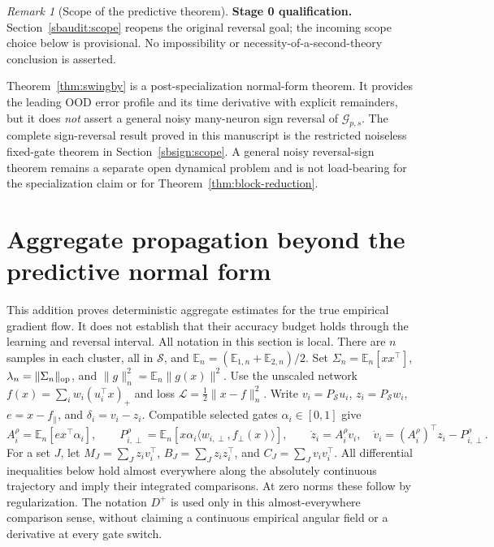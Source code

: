 \documentclass{article} %
\theoremstyle{plain}
\theoremstyle{definition}
\theoremstyle{remark}
\newtheorem{remark}[theorem]{Remark}
\begin{document}
\begin{remark}[Scope of the predictive theorem]
\label{rem:T3-scope-A}
\textbf{Stage 0 qualification.} Section~\ref{sbaudit:scope} reopens the original reversal goal; the incoming scope choice below is provisional. No impossibility or necessity-of-a-second-theory conclusion is asserted.

Theorem~\ref{thm:swingby} is a post-specialization normal-form theorem.  It
provides the leading OOD error profile and its time derivative with explicit
remainders, but it does \emph{not} assert a general noisy many-neuron sign
reversal of $\mathcal G_{p,s}$.  The complete sign-reversal result proved in
this manuscript is the restricted noiseless fixed-gate theorem in
Section~\ref{sbsign:scope}.  A general noisy reversal-sign theorem remains a
separate open dynamical problem and is not load-bearing for the specialization
claim or for Theorem~\ref{thm:block-reduction}.
\end{remark}

\section{Aggregate propagation beyond the predictive normal form}

\label{sbagg:scope}
This addition proves deterministic aggregate estimates for the true empirical
gradient flow. It does not establish that their accuracy budget holds through
the learning and reversal interval. All notation in this section is local.
There are $n$ samples in each cluster, all in $\mathcal S$, and
$\mathbb E_n=(\mathbb E_{1,n}+\mathbb E_{2,n})/2$.
Set $\Sigma_n=\mathbb E_n[xx^\top]$, $\lambda_n=\|\Sigma_n\|_{\rm op}$,
and $\|g\|_n^2=\mathbb E_n\|g(x)\|^2$. Use the unscaled network
$f(x)=\sum_iw_i(u_i^\top x)_+$ and loss
$\mathcal L=\frac12\|x-f\|_n^2$.
Write $v_i=P_{\mathcal S}u_i$, $z_i=P_{\mathcal S}w_i$,
$e=x-f_\parallel$, and $\delta_i=v_i-z_i$.
Compatible selected gates $\alpha_i\in[0,1]$ give
\[
 A_i^\rho=\mathbb E_n[e x^\top\alpha_i],\qquad
 P_{i,\perp}^\rho=\mathbb E_n[x\alpha_i
                  \langle w_{i,\perp},f_\perp(x)\rangle],
 \qquad \dot z_i=A_i^\rho v_i,\quad
 \dot v_i=(A_i^\rho)^\top z_i-P_{i,\perp}^\rho.
\]
For a set $J$, let $M_J=\sum_J z_iv_i^\top$, $B_J=\sum_Jz_iz_i^\top$,
and $C_J=\sum_Jv_iv_i^\top$.
All differential inequalities below hold almost everywhere along the
absolutely continuous trajectory and imply their integrated comparisons.
At zero norms these follow by regularization. The notation $D^+$ is used
only in this almost-everywhere comparison sense, without claiming a
continuous empirical angular field or a derivative at every gate switch.
\end{document}
